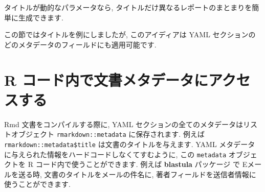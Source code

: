 \documentclass[
  11pt,
]{bxjsreport}
\newenvironment{Shaded}{\begin{snugshade}}{\end{snugshade}}
\newcommand{\AnnotationTok}[1]{\textcolor[rgb]{0.56,0.35,0.01}{\textbf{\textit{#1}}}}
\newcommand{\AttributeTok}[1]{\textcolor[rgb]{0.77,0.63,0.00}{#1}}
\newcommand{\CommentTok}[1]{\textcolor[rgb]{0.56,0.35,0.01}{\textit{#1}}}
\newcommand{\FunctionTok}[1]{\textcolor[rgb]{0.00,0.00,0.00}{#1}}
\newcommand{\InformationTok}[1]{\textcolor[rgb]{0.56,0.35,0.01}{\textbf{\textit{#1}}}}
\newcommand{\KeywordTok}[1]{\textcolor[rgb]{0.13,0.29,0.53}{\textbf{#1}}}
\newcommand{\NormalTok}[1]{#1}
\newcommand{\PreprocessorTok}[1]{\textcolor[rgb]{0.56,0.35,0.01}{\textit{#1}}}
\newcommand{\StringTok}[1]{\textcolor[rgb]{0.31,0.60,0.02}{#1}}
\begin{document}
\begin{Shaded}
\end{Shaded}

タイトルが動的なパラメータなら, タイトルだけ異なるレポートのまとまりを簡単に生成できます.

この節ではタイトルを例にしましたが, このアイディアは YAML セクションのどのメタデータのフィールドにも適用可能です.

\hypertarget{document-metadata}{%
\section{R コード内で文書メタデータにアクセスする}\label{document-metadata}}

Rmd 文書をコンパイルする際に, YAML セクションの全てのメタデータはリストオブジェクト \texttt{rmarkdown::metadata} に保存されます. 例えば \texttt{rmarkdown::metadata\$title} は文書のタイトルを与えます. YAML メタデータに与えられた情報をハードコードしなくてすむように, この \texttt{metadata} オブジェクトを R コード内で使うことができます. 例えば \textbf{blastula} パッケージ \autocite{R-blastula} で Eメールを送る時, 文書のタイトルをメールの件名に, 著者フィールドを送信者情報に使うことができます.

\begin{Shaded}
\end{Shaded}
\end{document}
